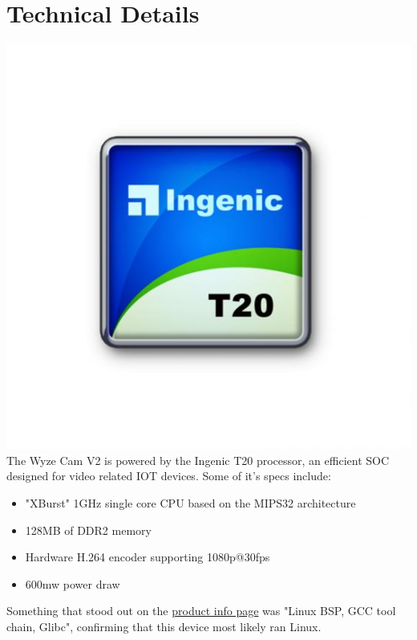 \documentclass[a4paper, 11pt]{article}
\begin{document}
\section{Technical Details}
\includegraphics[scale=0.5]{ingenic}\newline
The Wyze Cam V2 is powered by the Ingenic T20 processor, an efficient SOC designed for video related IOT devices. Some of it's specs include:
\begin{itemize}
  \item "XBurst" 1GHz single core CPU based on the MIPS32 architecture
  \item 128MB of DDR2 memory
  \item Hardware H.264 encoder supporting 1080p@30fps
  \item 600mw power draw
\end{itemize}
Something that stood out on the \href{https://www.indasina.com/ingenic-t20-fhd-smart-video-processor-best-choice-for-smart-video-application_p28.html}{product info page} was "Linux BSP, GCC tool chain, Glibc", confirming that this device most likely ran Linux.
\end{document}
